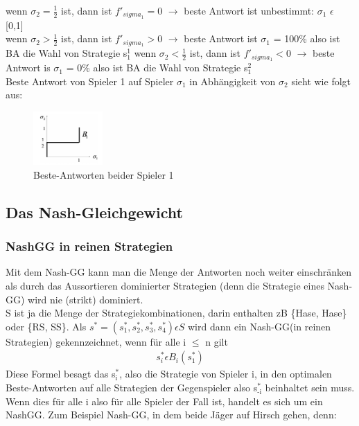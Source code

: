 \documentclass[11pt]{article}
\begin{document}
wenn \(\sigma_2 = \frac{1}{2}\) ist, dann ist \(f'_{sigma_1}=0\) \(\rightarrow\) beste Antwort ist unbestimmt: \(\sigma_{\text{1}}\) \(\epsilon\) [0,1]\\
wenn \(\sigma_2 > \frac{1}{2}\) ist, dann ist \(f'_{sigma_1}>0\) \(\rightarrow\) beste Antwort ist \(\sigma_{\text{1}}\) = 100\% also ist BA die Wahl von Strategie s\(^{\text{1}}_{\text{1}}\)
wenn \(\sigma_2 < \frac{1}{2}\) ist, dann ist \(f'_{sigma_1}<0\) \(\rightarrow\) beste Antwort is \(\sigma_{\text{1}}\) = 0\% also ist BA die Wahl von Strategie s\(^{\text{2}}_{\text{1}}\)\\
\newpage
Beste Antwort von Spieler 1 auf Spieler \(\sigma_{\text{1}}\) in Abhängigkeit von \(\sigma_{\text{2}}\) sieht wie folgt aus:
\begin{figure}[htbp]
\centering
\includegraphics[width=100px]{./Kop_Zahl_BA.png}
\caption{Beste-Antworten beider Spieler 1}
\end{figure}
\subsection{Das Nash-Gleichgewicht}
\label{sec:org86be637}
\subsubsection{NashGG in reinen Strategien}
\label{sec:org9ca2f09}
Mit dem Nash-GG kann man die Menge der Antworten noch weiter einschränken als durch das Aussortieren dominierter Strategien (denn die Strategie eines Nash-GG) wird nie (strikt) dominiert.\\
S ist ja die Menge der Strategiekombinationen, darin enthalten zB \{Hase, Hase\} oder \{RS, SS\}. Als \(s^* = (s^*_1, s^*_2, s^*_3, s^*_4) \epsilon S\) wird dann ein Nash-GG(in reinen Strategien) gekennzeichnet, wenn für alle i \(\le\) n gilt \\
\begin{equation*}
\begin{aligned}
s^*_i \epsilon B_i(s^*_1)
\end{aligned}
\end{equation*}
Diese Formel besagt das s\(^{\text{*}}_{\text{i}}\), also die Strategie von Spieler i, in den optimalen Beste-Antworten auf alle Strategien der Gegenspieler also s\(^{\text{*}}_{\text{-i}}\) beinhaltet sein muss. Wenn dies für alle i also für alle Spieler der Fall ist, handelt es sich um ein NashGG. Zum Beispiel Nash-GG, in dem beide Jäger auf Hirsch gehen, denn:
\end{document}
